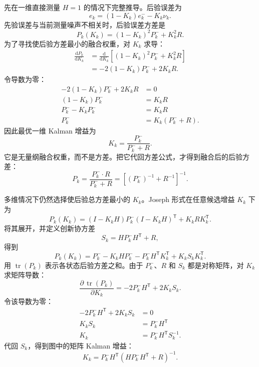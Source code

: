 \documentclass[UTF8,a4paper,11pt]{ctexart}
\newcommand{\prior}{^{-}}
\newcommand{\transpose}{^{\mathsf T}}
\begin{document}
先在一维直接测量 $H=1$ 的情况下完整推导。后验误差为
\begin{equation}
e_k=(1-K_k)e_k\prior-K_k\nu_k.
\end{equation}
先验误差与当前测量噪声不相关时，后验误差方差是
\begin{equation}
P_k(K_k)
=(1-K_k)^2P_k\prior+K_k^2R.
\end{equation}
为了寻找使后验方差最小的融合权重，对 $K_k$ 求导：
\begin{align}
\frac{\mathrm dP_k}{\mathrm dK_k}
&=\frac{\mathrm d}{\mathrm dK_k}
\left[(1-K_k)^2P_k\prior+K_k^2R\right]\\
&=-2(1-K_k)P_k\prior+2K_kR.
\end{align}
令导数为零：
\begin{align}
-2(1-K_k)P_k\prior+2K_kR&=0\\
(1-K_k)P_k\prior&=K_kR\\
P_k\prior-K_kP_k\prior&=K_kR\\
P_k\prior&=K_k(P_k\prior+R).
\end{align}
因此最优一维 Kalman 增益为
\begin{equation}
\boxed{
K_k=\frac{P_k\prior}{P_k\prior+R}
}.
\end{equation}
它是无量纲融合权重，而不是方差。把它代回方差公式，才得到融合后的后验方差：
\begin{equation}
\boxed{
P_k
=\frac{P_k\prior\!\cdot R}{P_k\prior+R}
=\left[(P_k\prior)^{-1}+R^{-1}\right]^{-1}
}.
\end{equation}

多维情况下仍然选择使后验总方差最小的 $K_k$。Joseph 形式在任意候选增益 $K_k$ 下为
\begin{equation}
P_k(K_k)
=(I-K_kH)P_k\prior(I-K_kH)\transpose+K_kRK_k\transpose.
\end{equation}
将其展开，并定义创新协方差
\begin{equation}
S_k=HP_k\prior H\transpose+R,
\end{equation}
得到
\begin{equation}
P_k(K_k)
=P_k\prior-K_kHP_k\prior
-P_k\prior H\transpose K_k\transpose
+K_kS_kK_k\transpose.
\end{equation}
用 $\operatorname{tr}(P_k)$ 表示各状态后验方差之和。由于 $P_k\prior$、$R$ 和 $S_k$ 都是对称矩阵，对 $K_k$ 求矩阵导数：
\begin{equation}
\frac{\partial\,\operatorname{tr}(P_k)}{\partial K_k}
=-2P_k\prior H\transpose+2K_kS_k.
\end{equation}
令该导数为零：
\begin{align}
-2P_k\prior H\transpose+2K_kS_k&=0\\
K_kS_k&=P_k\prior H\transpose\\
K_k&=P_k\prior H\transpose S_k^{-1}.
\end{align}
代回 $S_k$，得到图中的矩阵 Kalman 增益：
\begin{equation}
\boxed{
K_k
=P_k\prior H\transpose
(HP_k\prior H\transpose+R)^{-1}
}.
\end{equation}
\end{document}
